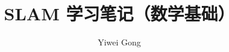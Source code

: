 \documentclass{article}
\begin{document}
\begin{CJK*}{UTF8}{gbsn}

    \title{SLAM 学习笔记（数学基础）}
    \author{Yiwei Gong}
    \maketitle

    \newpage

    

\end{CJK*}
\end{document}
